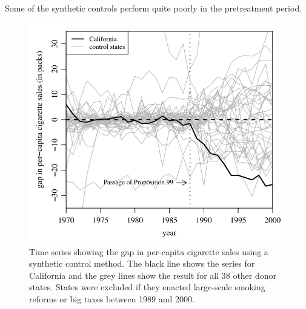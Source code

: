 \documentclass[notes,11pt, aspectratio=169]{beamer}
\begin{document}
\begin{frame}
    Some of the synthetic controls perform quite poorly in the pretreatment period.
    \begin{figure}
        \centering
        \begin{minipage}{0.45\linewidth}
            \includegraphics[width=\linewidth]{figures/38donors.png}
        \captionsetup{font=tiny} %
        \end{minipage}
        \caption*{\tiny Time series showing the gap in per-capita cigarette sales using a synthetic control method. The black
        line shows the series for California and the grey lines show the result for all 38 other donor states. States were
        excluded if they enacted large-scale smoking reforms or big taxes between 1989 and 2000.}    \end{figure}
\end{frame}
\end{document}
